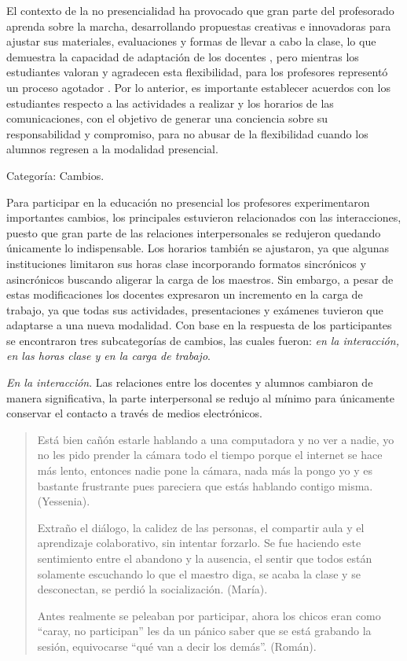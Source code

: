 \documentclass[spanish]{textolivre}
\begin{document}
El contexto de la no presencialidad ha provocado que gran parte del profesorado aprenda sobre la marcha, desarrollando propuestas creativas e innovadoras para ajustar sus materiales, evaluaciones y formas de llevar a cabo la clase, lo que demuestra la capacidad de adaptación de los docentes \cite{penuelas_ensenanza_2020}, pero mientras los estudiantes valoran y agradecen esta flexibilidad, para los profesores representó un proceso agotador \cite{allen_teaching_2020}. Por lo anterior, es importante establecer acuerdos con los estudiantes respecto a las actividades a realizar y los horarios de las comunicaciones, con el objetivo de generar una conciencia sobre su responsabilidad y compromiso, para no abusar de la flexibilidad cuando los alumnos regresen a la modalidad presencial. 

Categoría: Cambios.

Para participar en la educación no presencial los profesores experimentaron importantes cambios, los principales estuvieron relacionados con las interacciones, puesto que gran parte de las relaciones interpersonales se redujeron quedando únicamente lo indispensable. Los horarios también se ajustaron, ya que algunas instituciones limitaron sus horas clase incorporando formatos sincrónicos y asincrónicos buscando aligerar la carga de los maestros. Sin embargo, a pesar de estas modificaciones los docentes expresaron un incremento en la carga de trabajo, ya que todas sus actividades, presentaciones y exámenes tuvieron que adaptarse a una nueva modalidad. Con base en la respuesta de los participantes se encontraron tres subcategorías de cambios, las cuales fueron: \textit{en la interacción, en las horas clase y en la carga de trabajo}.

\textit{En la interacción}. Las relaciones entre los docentes y alumnos cambiaron de manera significativa, la parte interpersonal se redujo al mínimo para únicamente conservar el contacto a través de medios electrónicos.

\begin{quote}
    Está bien cañón estarle hablando a una computadora y no ver a nadie, yo no les pido prender la cámara todo el tiempo porque el internet se hace más lento, entonces nadie pone la cámara, nada más la pongo yo y es bastante frustrante pues pareciera que estás hablando contigo misma. (Yessenia).
    
    Extraño el diálogo, la calidez de las personas, el compartir aula y el aprendizaje colaborativo, sin intentar forzarlo. Se fue haciendo este sentimiento entre el abandono y la ausencia, el sentir que todos están solamente escuchando lo que el maestro diga, se acaba la clase y se desconectan, se perdió la socialización. (María).
    
    Antes realmente se peleaban por participar, ahora los chicos eran como “caray, no participan” les da un pánico saber que se está grabando la sesión, equivocarse “qué van a decir los demás”. (Román).
\end{quote}
\end{document}
